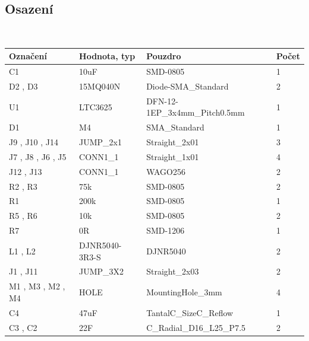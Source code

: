 \subsection{Osazení}


\begin{figure}[ht!]
	\centering
	\includegraphics[scale=2]{../../hw/cam_profi/SUPERCAP01B-top_cropped.pdf}
	\qquad
	\includegraphics[scale=2]{../../hw/cam_profi/SUPERCAP01B-bottom_cropped.pdf}
\end{figure}

\begin{center}
  \begin{tabular}{ | l | l | l | l |}
    \hline
    Označení & Hodnota, typ & Pouzdro & Počet \\ \hline
    \hline
			C1
 & 10uF & SMD-0805 & 1\\ \hline
			D2
, D3
 & 15MQ040N & Diode-SMA\_Standard & 2\\ \hline
			U1
 & LTC3625 & DFN-12-1EP\_3x4mm\_Pitch0.5mm & 1\\ \hline
			D1
 & M4 & SMA\_Standard & 1\\ \hline
			J9
, J10
, J14
 & JUMP\_2x1 & Straight\_2x01 & 3\\ \hline
			J7
, J8
, J6
, J5
 & CONN1\_1 & Straight\_1x01 & 4\\ \hline
			J12
, J13
 & CONN1\_1 & WAGO256 & 2\\ \hline
			R2
, R3
 & 75k & SMD-0805 & 2\\ \hline
			R1
 & 200k & SMD-0805 & 1\\ \hline
			R5
, R6
 & 10k & SMD-0805 & 2\\ \hline
			R7
 & 0R & SMD-1206 & 1\\ \hline
			L1
, L2
 & DJNR5040-3R3-S & DJNR5040 & 2\\ \hline
			J1
, J11
 & JUMP\_3X2 & Straight\_2x03 & 2\\ \hline
			M1
, M3
, M2
, M4
 & HOLE & MountingHole\_3mm & 4\\ \hline
			C4
 & 47uF & TantalC\_SizeC\_Reflow & 1\\ \hline
			C3
, C2
 & 22F & C\_Radial\_D16\_L25\_P7.5 & 2\\ \hline
	
  \end{tabular}
\end{center}